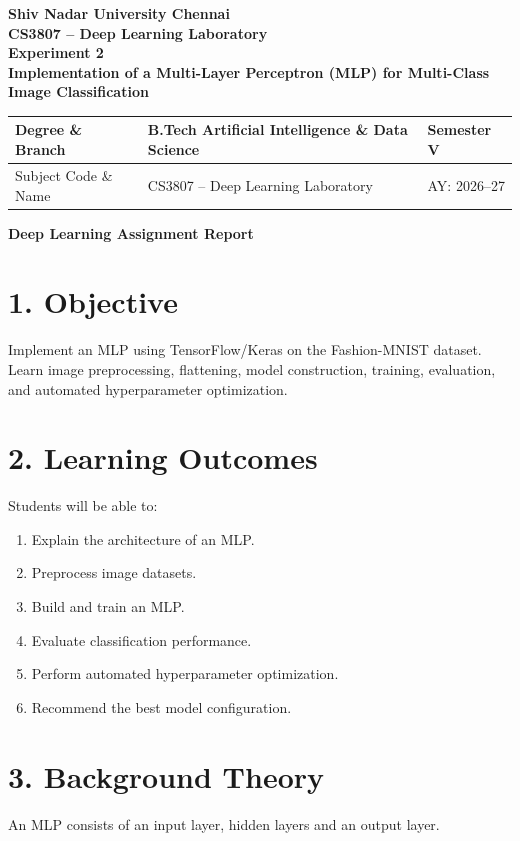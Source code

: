 \documentclass[11pt]{article}
\begin{document}
\begin{center}
{\Large\textbf{Shiv Nadar University Chennai}}\\
\textbf{CS3807 -- Deep Learning Laboratory}\\
\textbf{Experiment 2}\\
{\large\textbf{Implementation of a Multi-Layer Perceptron (MLP) for Multi-Class Image Classification}}
\end{center}

\renewcommand{\arraystretch}{1.25}

\begin{tabular}{|p{3.8cm}|p{8cm}|p{2cm}|}
\hline
Degree \& Branch & B.Tech Artificial Intelligence \& Data Science & Semester V\\ \hline
Subject Code \& Name & CS3807 -- Deep Learning Laboratory & AY: 2026--27\\ \hline
\end{tabular}
\begin{center}
    {\Huge \textbf{Deep Learning Assignment Report }}
\end{center}
\section*{1. Objective}
Implement an MLP using TensorFlow/Keras on the Fashion-MNIST dataset. Learn image preprocessing, flattening, model construction, training, evaluation, and automated hyperparameter optimization.

\section*{2. Learning Outcomes}
Students will be able to:
\begin{enumerate}
\item Explain the architecture of an MLP.
\item Preprocess image datasets.
\item Build and train an MLP.
\item Evaluate classification performance.
\item Perform automated hyperparameter optimization.
\item Recommend the best model configuration.
\end{enumerate}

\section*{3. Background Theory}
An MLP consists of an input layer, hidden layers and an output layer.
\end{document}
